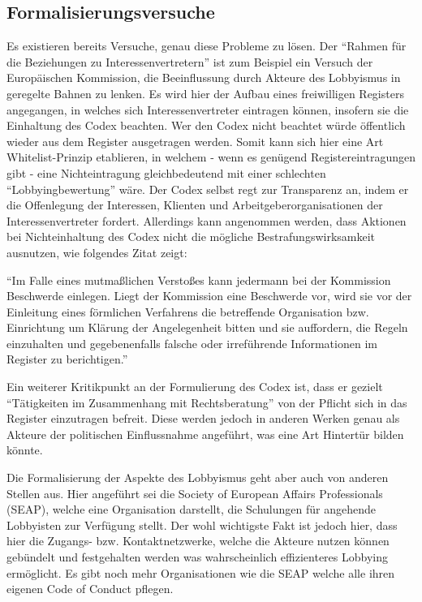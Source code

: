 \subsection{Formalisierungsversuche}
Es existieren bereits Versuche, genau diese Probleme zu lösen. Der ``Rahmen für 
die Beziehungen zu Interessenvertretern''\cite{EuLobbyCodex} ist zum Beispiel 
ein Versuch der 
Europäischen Kommission, die Beeinflussung durch Akteure des Lobbyismus in 
geregelte Bahnen zu lenken. Es wird hier der Aufbau eines freiwilligen 
Registers angegangen, in welches sich Interessenvertreter eintragen können, 
insofern sie die Einhaltung des Codex beachten. Wer den Codex nicht beachtet 
würde öffentlich wieder aus dem Register ausgetragen werden. Somit kann sich 
hier eine Art Whitelist-Prinzip etablieren, in welchem - wenn es genügend 
Registereintragungen gibt - eine Nichteintragung gleichbedeutend mit einer 
schlechten ``Lobbyingbewertung'' wäre. Der Codex selbst regt zur Transparenz 
an, indem er die Offenlegung der Interessen, Klienten und 
Arbeitgeberorganisationen der Interessenvertreter fordert. Allerdings kann 
angenommen werden, dass Aktionen bei Nichteinhaltung des Codex nicht die 
mögliche Bestrafungswirksamkeit ausnutzen, wie folgendes Zitat zeigt:
\begin{displayquote}
``Im Falle eines mutmaßlichen Verstoßes kann jedermann bei der Kommission 
Beschwerde einlegen. Liegt der Kommission eine Beschwerde vor, wird sie vor der 
Einleitung eines förmlichen Verfahrens die betreffende Organisation bzw. 
Einrichtung um Klärung der Angelegenheit bitten und sie auffordern, die Regeln 
einzuhalten und gegebenenfalls falsche oder irreführende Informationen im 
Register zu berichtigen.''\cite{EuLobbyCodex}
\end{displayquote}
Ein weiterer Kritikpunkt an der Formulierung des Codex ist, dass er gezielt 
``Tätigkeiten im Zusammenhang mit Rechtsberatung''\cite{EuLobbyCodex} von der 
Pflicht sich in das Register einzutragen befreit. Diese werden jedoch in 
anderen Werken\cite{LeifSpeth200312} genau als Akteure der politischen 
Einflussnahme angeführt, was eine Art Hintertür bilden könnte.

Die Formalisierung der Aspekte des Lobbyismus geht aber auch von anderen 
Stellen aus. Hier angeführt sei die Society of European Affairs Professionals 
(SEAP), welche eine Organisation darstellt, die Schulungen für angehende 
Lobbyisten zur Verfügung stellt. Der wohl wichtigste Fakt ist jedoch hier, dass 
hier die Zugangs- bzw. Kontaktnetzwerke, welche die Akteure nutzen können 
gebündelt und festgehalten werden was wahrscheinlich effizienteres Lobbying 
ermöglicht. Es gibt noch mehr Organisationen wie die SEAP welche alle ihren 
eigenen Code of Conduct pflegen.\cite{2012lobbyists}

